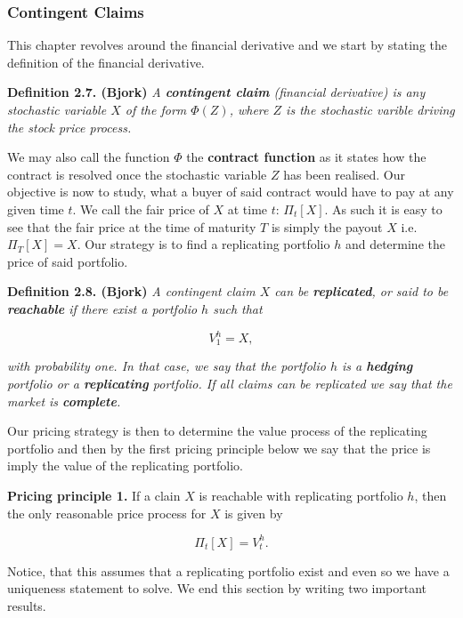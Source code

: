 \documentclass[
]{book}
\begin{document}
\hypertarget{contingent-claims}{%
\subsubsection{Contingent Claims}\label{contingent-claims}}

This chapter revolves around the financial derivative and we start by stating the definition of the financial derivative.

\textbf{Definition 2.7. (Bjork)} \emph{A \textbf{contingent claim} (financial derivative) is \emph{any} stochastic variable \(X\) of the form \(\Phi(Z)\), where \(Z\) is the stochastic varible driving the stock price process.}

We may also call the function \(\Phi\) the \textbf{contract function} as it states how the contract is resolved once the stochastic variable \(Z\) has been realised. Our objective is now to study, what a buyer of said contract would have to pay at any given time \(t\). We call the fair price of \(X\) at time \(t\): \(\Pi_t[X]\). As such it is easy to see that the fair price at the time of maturity \(T\) is simply the payout \(X\) i.e.~\(\Pi_T[X]=X\). Our strategy is to find a replicating portfolio \(h\) and determine the price of said portfolio.

\textbf{Definition 2.8. (Bjork)} \emph{A contingent claim \(X\) can be \textbf{replicated}, or said to be \textbf{reachable} if there exist a portfolio \(h\) such that}

\[
V_1^h=X,
\]

\emph{with probability one. In that case, we say that the portfolio \(h\) is a \textbf{hedging} portfolio or a \textbf{replicating} portfolio. If all claims can be replicated we say that the market is \textbf{complete}.}

Our pricing strategy is then to determine the value process of the replicating portfolio and then by the first pricing principle below we say that the price is imply the value of the replicating portfolio.

\textbf{Pricing principle 1.} If a clain \(X\) is reachable with replicating portfolio \(h\), then the only reasonable price process for \(X\) is given by

\[
\Pi_t[X]=V_t^h.
\]

Notice, that this assumes that a replicating portfolio exist and even so we have a uniqueness statement to solve. We end this section by writing two important results.
\end{document}

